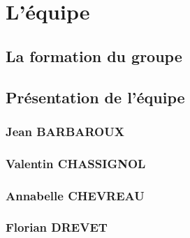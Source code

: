 \section{L'équipe}
\subsection{La formation du groupe}
\subsection{Présentation de l'équipe}
\subsubsection{Jean BARBAROUX}
\subsubsection{Valentin CHASSIGNOL}
\subsubsection{Annabelle CHEVREAU}
\subsubsection{Florian DREVET}
